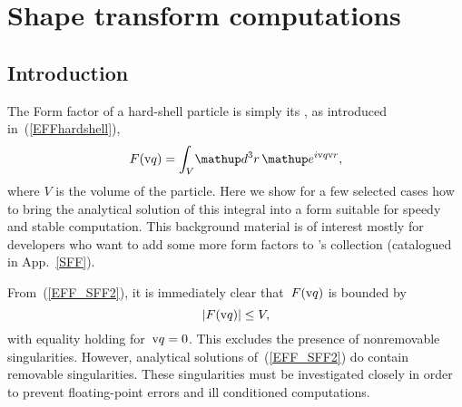 
\chapter{Shape transform computations}  \label{SFFcomp}


\section{Introduction}

The Form factor of a hard-shell particle is simply its ,
as introduced in~(\ref{EFFhardshell}),
\begin{equation}\label{EFF_SFF2}
  F(\q)=\int_V\!\d^3r\, \e^{i\q\r},
\end{equation}
where $V$ is the volume of the particle.
Here we show for a few selected cases
how to bring the analytical solution of this integral into a form
 suitable for speedy and stable computation.
This background material is of interest mostly for
developers who want to add some more form factors to \BornAgain's collection
(catalogued in App.~\ref{SFF}).

%
From~(\ref{EFF_SFF2}), it is immediately clear that~$F(\text{v}{q})$ is bounded by
\begin{equation}
  |F(\text{v}{q})|\le V,
\end{equation}
with equality holding for~$\text{v}{q}=0$.
This excludes the presence of nonremovable singularities.
However, analytical solutions of~(\ref{EFF_SFF2}) do contain
removable singularities.
These singularities must be investigated closely
in order to prevent floating-point errors and ill conditioned computations.


